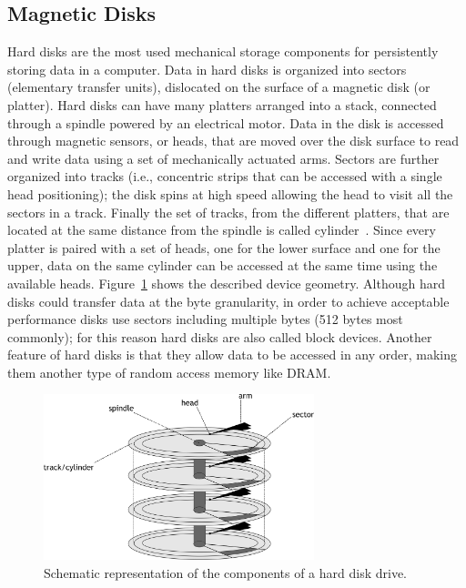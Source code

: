 \subsection{Magnetic Disks}
Hard disks are the most used mechanical storage components for persistently storing data in a computer. Data in hard disks is organized into sectors (elementary transfer units), dislocated on the surface 
of a magnetic disk (or platter). Hard disks can have many platters arranged into a stack, connected through a spindle powered by an electrical motor. Data in the disk is accessed through magnetic sensors, 
or heads, that are moved over the disk surface to read and write data using a set of mechanically actuated arms. Sectors are further organized into tracks (i.e., concentric strips that can be accessed with 
a single head positioning); the disk spins at high speed allowing the head to visit all the sectors in a track. Finally the set of tracks, from the different platters, that are located at the same distance 
from the spindle is called cylinder~\cite{Ruemmler1994}. Since every platter is paired with a set of heads, one for the lower surface and one for the upper, data on the same cylinder can be accessed at the same time using the 
available heads. Figure~\ref{figure: hdd} shows the described device geometry. Although hard disks could transfer data at the byte granularity, in order to achieve acceptable performance disks use sectors
including multiple bytes (512 bytes most commonly); for this reason hard disks are also called block devices. Another feature of hard disks is that they allow data to be accessed in any order, making them 
another type of random access memory like DRAM.

\begin{figure}[!htb]
  \centering
  \includegraphics[width=0.7\textwidth]{figures/hdd}
  \caption{Schematic representation of the components of a hard disk drive.}
  \label{figure: hdd}
\end{figure}

